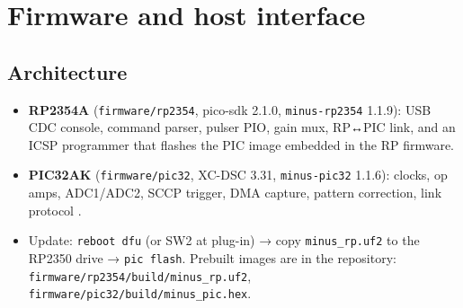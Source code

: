\documentclass[10pt,a4paper]{article}
\newcommand{\rpfwrel}{1.1.9}\newcommand{\picfwrel}{1.1.6}
\newcommand{\cmd}[1]{\texttt{#1}}
\begin{document}
\section{Firmware and host interface}
\subsection{Architecture}
\begin{itemize}
  \item \textbf{RP2354A} (\texttt{firmware/rp2354}, pico-sdk 2.1.0, \cmd{minus-rp2354} \rpfwrel): USB CDC console, command parser,
        pulser PIO, gain mux, RP↔PIC link, and an ICSP programmer that flashes the PIC image embedded in the RP firmware.
  \item \textbf{PIC32AK} (\texttt{firmware/pic32}, XC-DSC 3.31, \cmd{minus-pic32} \picfwrel): clocks, op amps, ADC1/ADC2, SCCP
        trigger, DMA capture, pattern correction, link protocol \vproto.
  \item Update: \cmd{reboot dfu} (or SW2 at plug-in) → copy \texttt{minus\_rp.uf2} to the RP2350 drive → \cmd{pic flash}.
        Prebuilt images are in the repository: \texttt{firmware/rp2354/build/minus\_rp.uf2}, \texttt{firmware/pic32/build/minus\_pic.hex}.
\end{itemize}
\end{document}
